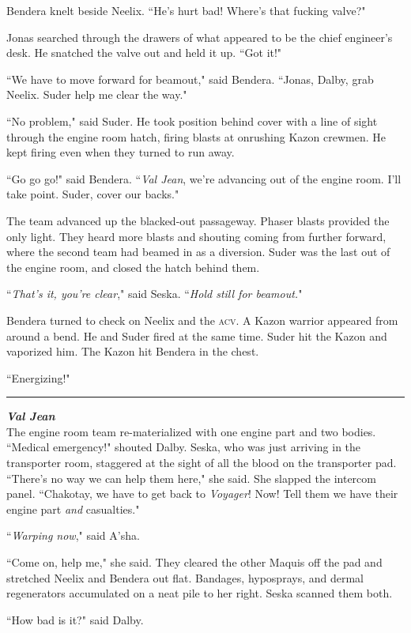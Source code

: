 \documentclass[twoside,letterpaper,12pt]{memoir}
\begin{document}
Bendera knelt beside Neelix. ``He's hurt bad! Where's that fucking valve?"

Jonas searched through the drawers of what appeared to be the chief engineer's desk. He snatched the valve out and held it up. ``Got it!"

``We have to move forward for beamout," said Bendera. ``Jonas, Dalby, grab Neelix. Suder help me clear the way."

``No problem," said Suder. He took position behind cover with a line of sight through the engine room hatch, firing blasts at onrushing Kazon crewmen. He kept firing even when they turned to run away.

``Go go go!" said Bendera. ``\textit{Val Jean}, we're advancing out of the engine room. I'll take point. Suder, cover our backs."

The team advanced up the blacked-out passageway. Phaser blasts provided the only light. They heard more blasts and shouting coming from further forward, where the second team had beamed in as a diversion. Suder was the last out of the engine room, and closed the hatch behind them.

``\textit{That's it, you're clear}," said Seska. ``\textit{Hold still for beamout.}"

Bendera turned to check on Neelix and the \textsc{acv}. A Kazon warrior appeared from around a bend. He and Suder fired at the same time. Suder hit the Kazon and vaporized him. The Kazon hit Bendera in the chest.

``Energizing!"

\fancybreak{\rule{3cm}{0.4 pt}}
\noindent\textit{\textbf{Val Jean}}\\

The engine room team re-materialized with one engine part and two bodies. ``Medical emergency!" shouted Dalby. Seska, who was just arriving in the transporter room, staggered at the sight of all the blood on the transporter pad. ``There's no way we can help them here," she said. She slapped the intercom panel. ``Chakotay, we have to get back to \textit{Voyager}! Now! Tell them we have their engine part \textit{and} casualties."

``\textit{Warping now}," said A'sha.

``Come on, help me," she said. They cleared the other Maquis off the pad and stretched Neelix and Bendera out flat. Bandages, hyposprays, and dermal regenerators accumulated on a neat pile to her right. Seska scanned them both.

``How bad is it?" said Dalby.
\end{document}
